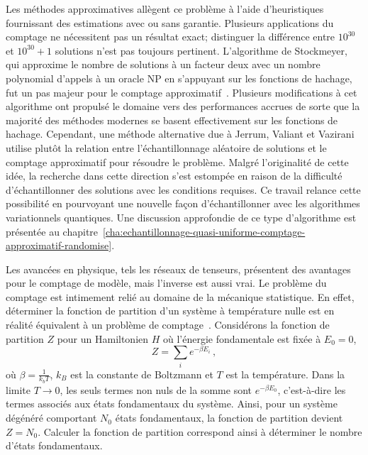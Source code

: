 Les méthodes approximatives allègent ce problème à l'aide d'heuristiques fournissant des estimations avec ou sans garantie. Plusieurs applications du comptage ne nécessitent pas un résultat exact; distinguer la différence entre $10^{30}$ et $10^{30}+1$ solutions n'est pas toujours pertinent. L'algorithme de Stockmeyer, qui approxime le nombre de solutions à un facteur deux avec un nombre polynomial d'appels à un oracle \textsf{NP} en s'appuyant sur les fonctions de hachage, fut un pas majeur pour le comptage approximatif~\cite{stockmeyerComplexityApproximateCounting1983}. Plusieurs modifications à cet algorithme ont propulsé le domaine vers des performances accrues de sorte que la majorité des méthodes modernes se basent effectivement sur les fonctions de hachage. Cependant, une méthode alternative due à Jerrum, Valiant et Vazirani utilise plutôt la relation entre l'échantillonnage aléatoire de solutions et le comptage approximatif pour résoudre le problème. Malgré l'originalité de cette idée, la recherche dans cette direction s'est estompée en raison de la difficulté d'échantillonner des solutions avec les conditions requises. Ce travail relance cette possibilité en pourvoyant une nouvelle façon d'échantillonner avec les algorithmes variationnels quantiques. Une discussion approfondie de ce type d'algorithme est présentée au chapitre~\ref{cha:echantillonnage-quasi-uniforme-comptage-approximatif-randomise}.

Les avancées en physique, tels les réseaux de tenseurs, présentent des avantages pour le comptage de modèle, mais l'inverse est aussi vrai. Le problème du comptage est intimement relié au domaine de la mécanique statistique. En effet, déterminer la fonction de partition d'un système à température nulle est en réalité équivalent à un problème de comptage~\cite{timmeCountingComplexDisordered2009}. Considérons la fonction de partition $Z$ pour un Hamiltonien $H$ où l'énergie fondamentale est fixée à $E_{0} = 0$,
\begin{equation}
    Z = \sum_{i} e^{-\beta E_{i}} \,,
\end{equation}
où $\beta = \frac{1}{k_{b} T}$, $k_{B}$ est la constante de Boltzmann et $T$ est la température. Dans la limite $T \to 0$, les seuls termes non nuls de la somme sont $e^{-\beta E_{0}}$, c'est-à-dire les termes associés aux états fondamentaux du système. Ainsi, pour un système dégénéré comportant $N_{0}$ états fondamentaux, la fonction de partition devient $Z = N_{0}$. Calculer la fonction de partition correspond ainsi à déterminer le nombre d'états fondamentaux.

